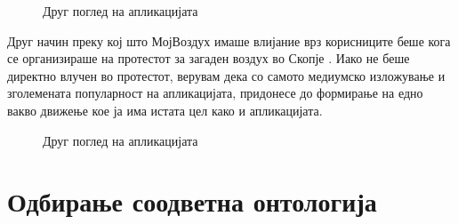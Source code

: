 \documentclass{uvamscse}
\begin{document}
\begin{figure}[H]
\centering
  \caption{Друг поглед на апликацијата}
  \label{fig:fbprofile}
\end{figure}

Друг начин преку кој што МојВоздух имаше влијание врз корисниците беше кога се организираше на протестот за загаден воздух во Скопје \cite{protest}. Иако не беше директно влучен во протестот, верувам дека со самото медиумско изложување и зголемената популарност на апликацијата, придонесе до формирање на едно вакво движење кое ја има истата цел како и апликацијата.

\begin{figure}[H]
\centering
  \caption{Друг поглед на апликацијата}
  \label{fig:protest}
\end{figure}
\chapter{Одбирање соодветна онтологија}
\end{document}
